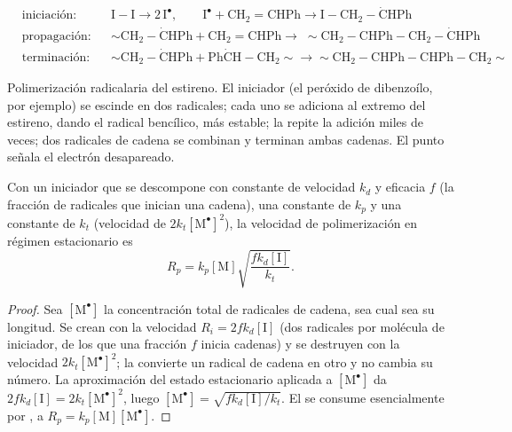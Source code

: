 \begin{omfigure}
\begin{align*}
&\text{iniciación:} && \mathrm{I{-}I} \longrightarrow 2\,\mathrm{I^{\bullet}}, \qquad
\mathrm{I^{\bullet} + CH_2{=}CHPh \longrightarrow I{-}CH_2{-}\dot{C}HPh} \\
&\text{propagación:} && {\sim}\mathrm{CH_2{-}\dot{C}HPh + CH_2{=}CHPh \longrightarrow}\;
{\sim}\mathrm{CH_2{-}CHPh{-}CH_2{-}\dot{C}HPh} \\
&\text{terminación:} && {\sim}\mathrm{CH_2{-}\dot{C}HPh + Ph\dot{C}H{-}CH_2}{\sim} \longrightarrow
{\sim}\mathrm{CH_2{-}CHPh{-}CHPh{-}CH_2}{\sim}
\end{align*}

{\small Polimerización radicalaria del estireno. El iniciador  (el peróxido de dibenzoílo, por ejemplo)
se escinde en dos radicales; cada uno se adiciona al extremo  del estireno, dando el radical
bencílico, más estable; la  repite la adición miles de veces; dos radicales de cadena se combinan y terminan ambas
cadenas. El punto señala el electrón desapareado.}
\end{omfigure}

\begin{theorem}\label{thm:b2:polymer-synthesis:radical-rate}
Con un iniciador que se descompone con constante de velocidad $k_d$ y eficacia $f$ (la fracción de radicales que
inician una cadena), una constante de  $k_p$ y una constante de  $k_t$ (velocidad de  $2k_t
[\mathrm{M^\bullet}]^2$), la velocidad de polimerización en régimen estacionario es
\begin{equation*}
R_p = k_p [\mathrm M] \sqrt{\frac{f k_d [\mathrm I]}{k_t}}.
\end{equation*}
\end{theorem}

\begin{proof}
Sea $[\mathrm{M^\bullet}]$ la concentración total de radicales de cadena, sea cual sea su longitud. Se
crean con la velocidad $R_i = 2fk_d[\mathrm I]$ (dos radicales por molécula de iniciador, de los que una fracción $f$
inicia cadenas) y se destruyen con la velocidad $2k_t[\mathrm{M^\bullet}]^2$; la  convierte un radical de cadena
en otro y no cambia su número. La aproximación del estado estacionario aplicada a
$[\mathrm{M^\bullet}]$ da $2fk_d[\mathrm I] = 2k_t[\mathrm{M^\bullet}]^2$, luego $[\mathrm{M^\bullet}] =
\sqrt{fk_d[\mathrm I]/k_t}$. El  se consume esencialmente por , a $R_p =
k_p[\mathrm M][\mathrm{M^\bullet}]$.
\end{proof}

